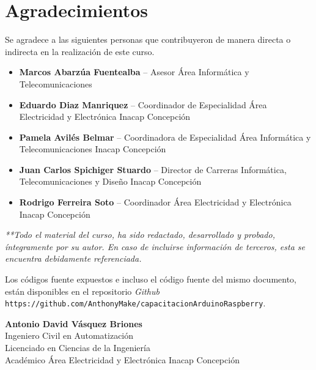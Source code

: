 \documentclass[letterpaper, 10pt]{report}
\begin{document}
\section*{Agradecimientos}

Se agradece a las siguientes personas que contribuyeron de manera directa o indirecta en la realización de este curso.
\begin{itemize}
\itemsep=0pt
\item \textbf{Marcos Abarzúa Fuentealba} -- Asesor Área Informática y Telecomunicaciones
\item \textbf{Eduardo Diaz Manriquez} -- Coordinador de Especialidad Área Electricidad y Electrónica Inacap Concepción
\item \textbf{Pamela Avilés Belmar} -- Coordinadora de Especialidad Área Informática y Telecomunicaciones Inacap Concepción
\item \textbf{Juan Carlos Spichiger Stuardo} -- Director de Carreras Informática, Telecomunicaciones y Diseño Inacap Concepción
\item \textbf{Rodrigo Ferreira Soto} -- Coordinador Área Electricidad y Electrónica Inacap Concepción 
\end{itemize}
\vspace{100pt}
{\it
**Todo el material del curso, ha sido redactado, desarrollado y probado, íntegramente por su autor. En caso de incluirse información de terceros, esta se encuentra debidamente referenciada.

Los códigos fuente expuestos e incluso el código fuente del mismo documento, están disponibles en el repositorio \emph{Github} \texttt{https://github.com/AnthonyMake/capacitacionArduinoRaspberry}.}

\vspace{150pt}

\begin{flushright}
\textbf{Antonio David Vásquez Briones}\\
Ingeniero Civil en Automatización\\
Licenciado en Ciencias de la Ingeniería\\
Académico Área Electricidad y Electrónica Inacap Concepción
\end{flushright}
\end{document}
